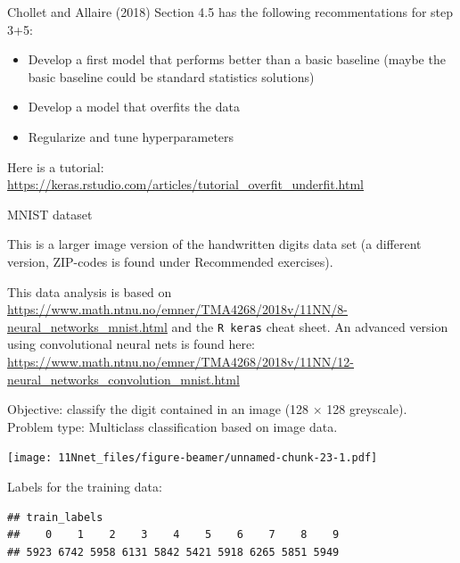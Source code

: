 \documentclass[10pt,ignorenonframetext,]{beamer}
\providecommand{\tightlist}{%
  \setlength{\itemsep}{0pt}\setlength{\parskip}{0pt}}
\begin{document}
\begin{frame}

Chollet and Allaire (2018) Section 4.5 has the following recommentations
for step 3+5:

\begin{itemize}
\tightlist
\item
  Develop a first model that performs better than a basic baseline
  (maybe the basic baseline could be standard statistics solutions)
\item
  Develop a model that overfits the data
\item
  Regularize and tune hyperparameters
\end{itemize}

Here is a tutorial:
\url{https://keras.rstudio.com/articles/tutorial_overfit_underfit.html}

\end{frame}

\begin{frame}[fragile]

\begin{block}{MNIST dataset}

This is a larger image version of the handwritten digits data set (a
different version, ZIP-codes is found under Recommended exercises).

This data analysis is based on
\url{https://www.math.ntnu.no/emner/TMA4268/2018v/11NN/8-neural_networks_mnist.html}
and the \texttt{R\ keras} cheat sheet. An advanced version using
convolutional neural nets is found here:
\url{https://www.math.ntnu.no/emner/TMA4268/2018v/11NN/12-neural_networks_convolution_mnist.html}

\end{block}

\end{frame}

\begin{frame}

Objective: classify the digit contained in an image (128 \(\times\) 128
greyscale). Problem type: Multiclass classification based on image data.

\scriptsize

\texttt{[image: 11Nnet\_files/figure-beamer/unnamed-chunk-23-1.pdf]}

\end{frame}

\begin{frame}[fragile]

Labels for the training data:

\begin{verbatim}
## train_labels
##    0    1    2    3    4    5    6    7    8    9 
## 5923 6742 5958 6131 5842 5421 5918 6265 5851 5949
\end{verbatim}

\end{frame}
\end{document}
